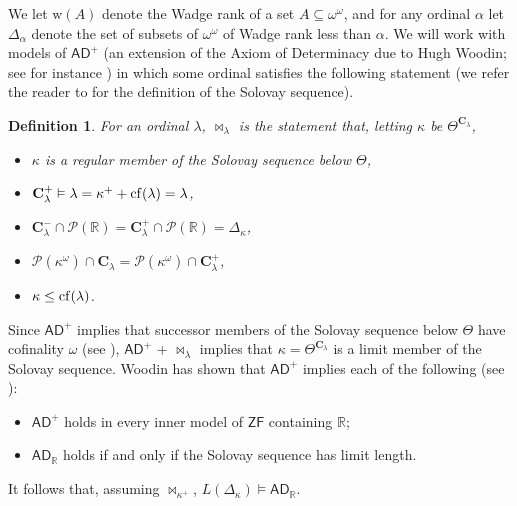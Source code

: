 \documentclass[12pt]{article}
\newtheorem{definition}[theorem]{Definition}
\newtheorem{remark}[theorem]{Remark}
\def\c{{\mathbf{C}}}
\renewcommand{\models}{\vDash}
\newcommand{\bR}{{\mathbb{R}}}
\newcommand{\powerset}{\mathcal{P}}
\newcommand{\cf}{{\rm cf}}
\def\a{\alpha}
\newcommand{\AD}{\mathsf{AD}}
\newcommand{\ADR}{\mathsf{AD}_{\mathbb{R}}}
\newcommand{\rmw}{\mathrm{w}}
\newcommand{\bbR}{\mathbb{R}}
\newcommand{\breals}{\omega^{\omega}}
\newcommand{\ZF}{\mathsf{ZF}}
\newcommand{\restrict}{\mathord{\upharpoonright}}
\begin{document}




We let $\rmw(A)$ denote the Wadge rank of a set $A \subseteq \breals$, and for any ordinal $\alpha$ let $\Delta_{\alpha}$ denote the set of subsets of $\breals$ of Wadge rank less than $\alpha$.
We will work with models of $\AD^{+}$ (an extension of the Axiom of Determinacy due to Hugh Woodin; see for instance \cite{LarsonAD}) in which some ordinal satisfies the following statement (we refer the reader to \cite{Solovay, Woodin, LarsonAD} for the definition of the Solovay sequence).

\begin{definition}
For an ordinal $\lambda$, $\Join_\lambda$ is the statement that, letting $\kappa$ be $\Theta^{\c_\lambda}$,
\begin{itemize}
\item $\kappa$ is a regular member of the Solovay sequence below $\Theta$,
\item $\c^+_{\lambda}\models \lambda=\kappa^{+} +\cf(\lambda)=\lambda$,
\item $\c_\lambda^{-} \cap \powerset(\bR)
=\c_{\lambda}^+\cap \powerset(\bR)=\Delta_\kappa$,
\item $\powerset(\kappa^\omega)\cap \c_{\lambda}=\powerset(\kappa^\omega)\cap \c_{\lambda}^+$,
\item $\kappa\leq \cf(\lambda)$.
\end{itemize}
\end{definition}


Since $\AD^{+}$ implies that successor members of the Solovay sequence below $\Theta$ have cofinality $\omega$ (see \cite{LarsonAD}), $\AD^{+}$ + $\Join_{\lambda}$ implies that $\kappa = \Theta^{\c_\lambda}$ is a limit member of the Solovay sequence. Woodin has shown that $\AD^{+}$ implies each of the following (see \cite{LarsonAD}):
\begin{itemize}
\item $\AD^{+}$ holds in every inner model of $\ZF$ containing $\bbR$;
\item $\ADR$ holds if and only if the Solovay sequence has limit length.
\end{itemize}
It follows that, assuming $\Join_{\kappa^{+}}$, $L(\Delta_{\kappa}) \models \ADR$.
\end{document}
